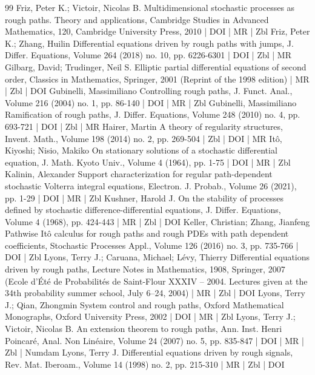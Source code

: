 \begin{thebibliography}{99}
Friz, Peter K.; Victoir, Nicolas B. Multidimensional stochastic processes as rough paths. Theory and applications, Cambridge Studies in Advanced Mathematics, 120, Cambridge University Press, 2010 | DOI | MR | Zbl
Friz, Peter K.; Zhang, Huilin Differential equations driven by rough paths with jumps, J. Differ. Equations, Volume 264 (2018) no. 10, pp. 6226-6301 | DOI | Zbl | MR
Gilbarg, David; Trudinger, Neil S. Elliptic partial differential equations of second order, Classics in Mathematics, Springer, 2001 (Reprint of the 1998 edition) | MR | Zbl | DOI
Gubinelli, Massimiliano Controlling rough paths, J. Funct. Anal., Volume 216 (2004) no. 1, pp. 86-140 | DOI | MR | Zbl
Gubinelli, Massimiliano Ramification of rough paths, J. Differ. Equations, Volume 248 (2010) no. 4, pp. 693-721 | DOI | Zbl | MR
Hairer, Martin A theory of regularity structures, Invent. Math., Volume 198 (2014) no. 2, pp. 269-504 | Zbl | DOI | MR
Itô, Kiyoshi; Nisio, Makiko On stationary solutions of a stochastic differential equation, J. Math. Kyoto Univ., Volume 4 (1964), pp. 1-75 | DOI | MR | Zbl
Kalinin, Alexander Support characterization for regular path-dependent stochastic Volterra integral equations, Electron. J. Probab., Volume 26 (2021), pp. 1-29 | DOI | MR | Zbl
Kushner, Harold J. On the stability of processes defined by stochastic difference-differential equations, J. Differ. Equations, Volume 4 (1968), pp. 424-443 | MR | Zbl | DOI
Keller, Christian; Zhang, Jianfeng Pathwise Itô calculus for rough paths and rough PDEs with path dependent coefficients, Stochastic Processes Appl., Volume 126 (2016) no. 3, pp. 735-766 | DOI | Zbl
Lyons, Terry J.; Caruana, Michael; Lévy, Thierry Differential equations driven by rough paths, Lecture Notes in Mathematics, 1908, Springer, 2007 (Ecole d’Été de Probabilités de Saint-Flour XXXIV – 2004. Lectures given at the 34th probability summer school, July 6–24, 2004) | MR | Zbl | DOI
Lyons, Terry J.; Qian, Zhongmin System control and rough paths, Oxford Mathematical Monographs, Oxford University Press, 2002 | DOI | MR | Zbl
Lyons, Terry J.; Victoir, Nicolas B. An extension theorem to rough paths, Ann. Inst. Henri Poincaré, Anal. Non Linéaire, Volume 24 (2007) no. 5, pp. 835-847 | DOI | MR | Zbl | Numdam
Lyons, Terry J. Differential equations driven by rough signals, Rev. Mat. Iberoam., Volume 14 (1998) no. 2, pp. 215-310 | MR | Zbl | DOI

\end{thebibliography}
